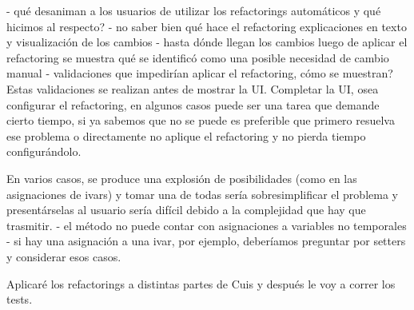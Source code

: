 
- qué desaniman a los usuarios de utilizar los refactorings automáticos y qué hicimos al respecto?
    - no saber bien qué hace el refactoring
    explicaciones en texto y visualización de los cambios
    - hasta dónde llegan los cambios
    luego de aplicar el refactoring se muestra qué se identificó como una posible necesidad de cambio manual
- validaciones que impedirían aplicar el refactoring, cómo se muestran? Estas validaciones se
realizan antes de mostrar la UI. Completar la UI, osea configurar el refactoring, en algunos
casos puede ser una tarea que demande cierto tiempo, si ya sabemos que no se puede es preferible
que primero resuelva ese problema o directamente no aplique el refactoring y no pierda tiempo
configurándolo.



En varios casos, se produce una explosión de posibilidades (como en las asignaciones de ivars) y
tomar una de todas sería sobresimplificar el problema y presentárselas al usuario sería
difícil debido a la complejidad que hay que trasmitir.
- el método no puede contar con asignaciones a variables no temporales
- si hay una asignación a una ivar, por ejemplo, deberíamos preguntar por setters y considerar esos
casos.



Aplicaré los refactorings a distintas partes de Cuis y después le voy a correr los tests.
